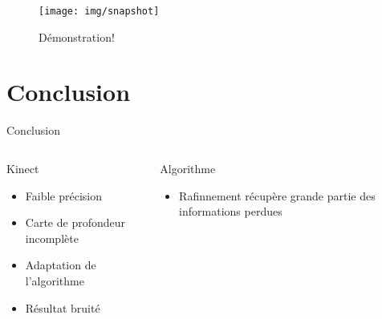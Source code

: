 \documentclass[compress,pdf,11pt,xcolor=dvipsnames]{beamer}
\begin{document}
\begin{frame}{}
\begin{figure}[ht!]
  \begin{center}
    \texttt{[image: img/snapshot]}
  \end{center}
\end{figure}


\end{frame}{}

\begin{frame}{}
  \begin{figure}
    \begin{centering}
      \Huge Démonstration!
      \par\end{centering}
  \end{figure}
\end{frame}

\section{Conclusion}

\begin{frame}{Conclusion}
  
  \begin{columns}
    \begin{column}{0.5\textwidth}
     
      \begin{beamerboxesrounded}[shadow=true]{Kinect}
        \begin{itemize}
        \item Faible précision
        \item Carte de profondeur incomplète
        \item Adaptation de l'algorithme
        \item Résultat bruité
        \end{itemize}
      \end{beamerboxesrounded}
    \end{column}    
    
    \begin{column}{0.5\textwidth}
      \begin{exampleblock}{Algorithme}
        \begin{itemize}
        \item Rafinnement récupère grande partie des informations perdues
        \end{itemize}
      \end{exampleblock}

    \end{column}    
  \end{columns}    
  
\end{frame}
\end{document}
